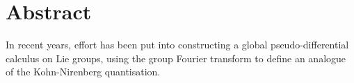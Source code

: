 \chapter*{Abstract}

In recent years,
effort has been put into constructing a global pseudo-differential calculus on Lie groups,
using the group Fourier transform to define an analogue of the Kohn-Nirenberg quantisation.
